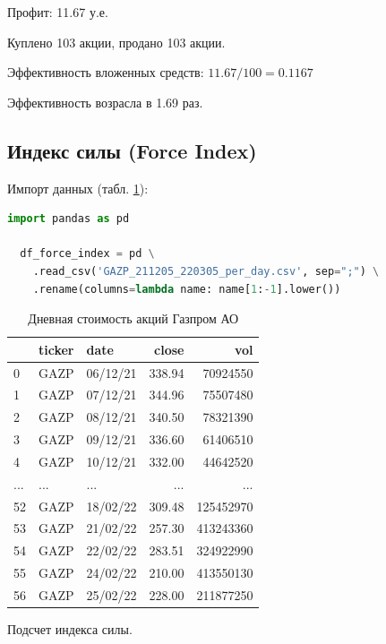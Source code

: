 \documentclass[14pt,a4paper]{extarticle}%
\begin{document}
Профит: 11.67 у.е.

Куплено 103 акции, продано 103 акции.

Эффективность вложенных средств: $11.67 / 100 = 0.1167$

Эффективность возрасла в 1.69 раз.
\pagebreak

\subsection{Индекс силы (Force Index)}

Импорт данных (табл. \ref{table:data_per_day}):

\begin{lstlisting}[basicstyle=\small, language=Python]
  import pandas as pd

  df_force_index = pd \
    .read_csv('GAZP_211205_220305_per_day.csv', sep=";") \
    .rename(columns=lambda name: name[1:-1].lower())
\end{lstlisting}

\begin{table}[H]
  \centering
  \begin{tabular}{lllrr}
    \toprule
    {} & ticker &      date &   close &       vol \\
    \midrule
    0 &   GAZP &  06/12/21 &  338.94 &  70924550 \\
    1 &   GAZP &  07/12/21 &  344.96 &  75507480 \\
    2 &   GAZP &  08/12/21 &  340.50 &  78321390 \\
    3 &   GAZP &  09/12/21 &  336.60 &  61406510 \\
    4 &   GAZP &  10/12/21 &  332.00 &  44642520 \\
    ... &   ... &  ... &  ... &  ... \\
    52 &   GAZP &  18/02/22 &  309.48 &  125452970 \\
    53 &   GAZP &  21/02/22 &  257.30 &  413243360 \\
    54 &   GAZP &  22/02/22 &  283.51 &  324922990 \\
    55 &   GAZP &  24/02/22 &  210.00 &  413550130 \\
    56 &   GAZP &  25/02/22 &  228.00 &  211877250 \\
    \bottomrule
  \end{tabular}
  \caption{Дневная стоимость акций Газпром АО}
  \label{table:data_per_day}
\end{table}

Подсчет индекса силы.
\end{document}
